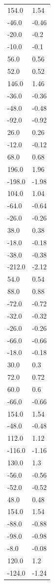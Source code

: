 \begin{longtable}{ll}
154.0 & 1.54 \\
-46.0 & -0.46 \\
-20.0 & -0.2 \\
-10.0 & -0.1 \\
56.0 & 0.56 \\
52.0 & 0.52 \\
146.0 & 1.46 \\
-36.0 & -0.36 \\
-48.0 & -0.48 \\
-92.0 & -0.92 \\
26.0 & 0.26 \\
-12.0 & -0.12 \\
68.0 & 0.68 \\
196.0 & 1.96 \\
-198.0 & -1.98 \\
104.0 & 1.04 \\
-64.0 & -0.64 \\
-26.0 & -0.26 \\
38.0 & 0.38 \\
-18.0 & -0.18 \\
-38.0 & -0.38 \\
-212.0 & -2.12 \\
54.0 & 0.54 \\
88.0 & 0.88 \\
-72.0 & -0.72 \\
-32.0 & -0.32 \\
-26.0 & -0.26 \\
-66.0 & -0.66 \\
-18.0 & -0.18 \\
30.0 & 0.3 \\
72.0 & 0.72 \\
60.0 & 0.6 \\
-66.0 & -0.66 \\
154.0 & 1.54 \\
-48.0 & -0.48 \\
112.0 & 1.12 \\
-116.0 & -1.16 \\
130.0 & 1.3 \\
-56.0 & -0.56 \\
-52.0 & -0.52 \\
48.0 & 0.48 \\
154.0 & 1.54 \\
-88.0 & -0.88 \\
-98.0 & -0.98 \\
-8.0 & -0.08 \\
120.0 & 1.2 \\
-124.0 & -1.24 \\

\end{longtable}
